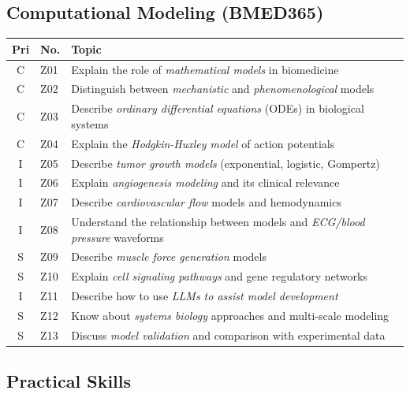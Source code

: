 \documentclass[11pt,a4paper]{article}
\begin{document}
\subsection{Computational Modeling (BMED365)}

\begin{longtable}{@{}clp{9cm}@{}}
\toprule
\textbf{Pri} & \textbf{No.} & \textbf{Topic} \\
\midrule
\endfirsthead
\midrule
\endhead
\midrule
\endfoot
\bottomrule
\endlastfoot
C & Z01 & Explain the role of \emph{mathematical models} in biomedicine \\
C & Z02 & Distinguish between \emph{mechanistic} and \emph{phenomenological} models \\
C & Z03 & Describe \emph{ordinary differential equations} (ODEs) in biological systems \\
C & Z04 & Explain the \emph{Hodgkin-Huxley model} of action potentials \\
I & Z05 & Describe \emph{tumor growth models} (exponential, logistic, Gompertz) \\
I & Z06 & Explain \emph{angiogenesis modeling} and its clinical relevance \\
I & Z07 & Describe \emph{cardiovascular flow} models and hemodynamics \\
I & Z08 & Understand the relationship between models and \emph{ECG/blood pressure} waveforms \\
S & Z09 & Describe \emph{muscle force generation} models \\
S & Z10 & Explain \emph{cell signaling pathways} and gene regulatory networks \\
I & Z11 & Describe how to use \emph{LLMs to assist model development} \\
S & Z12 & Know about \emph{systems biology} approaches and multi-scale modeling \\
S & Z13 & Discuss \emph{model validation} and comparison with experimental data \\
\end{longtable}

\subsection{Practical Skills}
\end{document}
